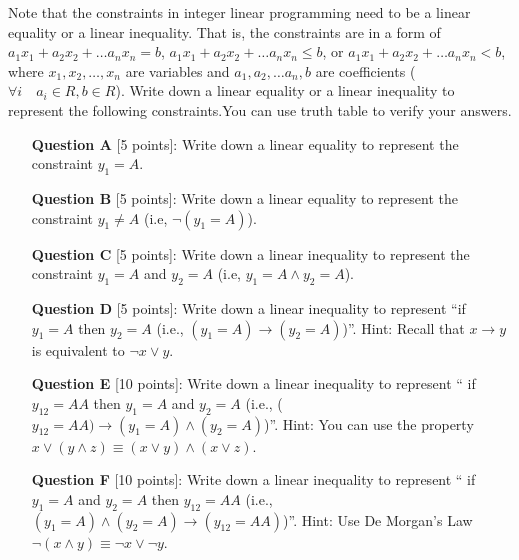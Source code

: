 Note that the constraints in integer linear programming need to be a linear equality or a linear inequality. That is, the constraints are  in a form of $a_1 x_1+ a_2 x_2 + \ldots a_n x_n = b$,  $a_1 x_1+ a_2 x_2 + \ldots a_n x_n \leq b$, or 
$a_1 x_1+ a_2 x_2 + \ldots a_n x_n < b$, where
$x_1, x_2, \ldots, x_n$ are variables and $a_1, a_2, \ldots a_n, b$ are coefficients ($\forall i \quad a_i\in R, b\in R$). Write down a linear  equality or a linear inequality to represent the following constraints.You can use truth table to verify your answers.
\begin{itemize}
\item[{\bf Question A}][5 points]: Write down a linear equality to represent the constraint $y_1=A$.

\item [{\bf Question B}][5 points]:  Write down a linear equality to represent the constraint $y_1 \neq A$ (i.e, $\neg (y_1=A)$).
 
\item [{\bf Question C}][5 points]:  Write down a linear inequality to  represent
the constraint $y_1=A$ and $y_2 =A$ (i.e, $y_1=A\wedge y_2=A$).

\item [{\bf Question D}][5 points]: Write down a linear inequality to represent ``if $y_1=A$ then $y_2 =A$ (i.e., $(y_1=A) \rightarrow (y_2=A)$)''.
Hint: Recall that $x\rightarrow y$ is equivalent to $\neg x \vee y$.  

\item [{\bf Question E}][10 points]:  Write down a linear inequality to represent ``
if $y_{12}=AA$ then $y_1 =A$ and $y_2=A$ (i.e., ($y_{12}=AA) \rightarrow (y_1=A) \wedge (y_2 = A)$)''.
Hint: You can use the property  $x\vee (y \wedge z) \equiv (x\vee y) \wedge (x \vee z)$.

\item [ {\bf Question F}][10 points]: Write down a linear inequality to represent ``
if  $y_1 =A$ and $y_2=A$ then $y_{12}=AA$ (i.e., $(y_1=A) \wedge (y_2 = A) \rightarrow (y_{12}=AA)$)''.
Hint: Use De Morgan's Law  $\neg (x \wedge y) \equiv \neg x \vee \neg y$.
\end{itemize}

